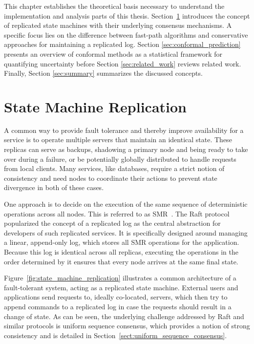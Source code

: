 This chapter establishes the theoretical basis necessary to understand the implementation and analysis parts of this thesis. Section~\ref{sec:state_machine_replication} introduces the concept of replicated state machines with their underlying consensus mechanisms. A specific focus lies on the difference between fast-path algorithms and conservative approaches for maintaining a replicated log. Section \ref{sec:conformal_prediction} presents an overview of conformal methods as a statistical framework for quantifying uncertainty before Section \ref{sec:related_work} reviews related work. Finally, Section \ref{sec:summary} summarizes the discussed concepts.

\section{State Machine Replication}
\label{sec:state_machine_replication}
A common way to provide fault tolerance and thereby improve availability for a service is to operate multiple servers that maintain an identical state. These replicas can serve as backups, shadowing a primary node and being ready to take over during a failure, or be potentially globally distributed to handle requests from local clients. Many services, like databases, require a strict notion of consistency and need nodes to coordinate their actions to prevent state divergence in both of these cases.

One approach is to decide on the execution of the same sequence of deterministic operations across all nodes. This is referred to as \gls{SMR}~\cite{Schneider-ReplicatedStateMachines-1990}. The Raft protocol~\cite{Ongaro-Raft-2014} popularized the concept of a replicated log as the central abstraction for developers of such replicated services. It is specifically designed around managing a linear, append-only log, which stores all \gls{SMR} operations for the application. Because this log is identical across all replicas, executing the operations in the order determined by it ensures that every node arrives at the same final state.

Figure~\ref{fig:state_machine_replication} illustrates a common architecture of a fault-tolerant system, acting as a replicated state machine. External users and applications send requests to, ideally co-located, servers, which then try to append commands to a replicated log in case the requests should result in a change of state. As can be seen, the underlying challenge addressed by Raft and similar protocols is uniform sequence consensus, which provides a notion of strong consistency and is detailed in Section~\ref{sect:uniform_sequence_consensus}.

